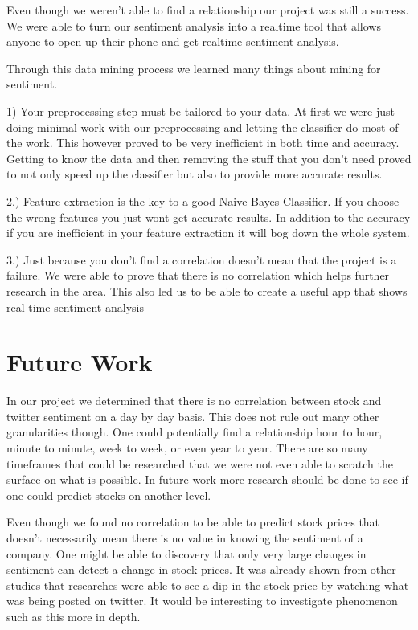 \documentclass{acm_proc_article-sp}
\begin{document}
Even though we weren't able to find a relationship our project was still a success.
We were able to turn our sentiment analysis into a realtime tool that allows anyone
to open up their phone and get realtime sentiment analysis. 

Through this data mining process we learned many things about mining for sentiment.

1) Your preprocessing step must be tailored to your data. At first we were just doing
minimal work with our preprocessing and letting the classifier do most of the work. 
This however proved to be very inefficient in both time and accuracy. Getting to know
the data and then removing the stuff that you don't need proved to not only speed 
up the classifier but also to provide more accurate results.

2.) Feature extraction is the key to a good Naive Bayes Classifier. If you choose
the wrong features you just wont get accurate results. In addition to the accuracy
if you are inefficient in your feature extraction it will bog down the whole system. 

3.) Just because you don't find a correlation doesn't mean that the project is a failure.
We were able to prove that there is no correlation which helps further research in 
the area. This also led us to be able to create a useful app that shows real time 
sentiment analysis

\section{Future Work}

In our project we determined that there is no correlation between stock and
twitter sentiment on a day by day basis. This does not rule out many other
granularities though.  One could potentially find a relationship hour to hour,
minute to minute, week to week, or even year to year. There are so many
timeframes that could be researched that we were not even able to scratch the
surface on what is possible. In future work more research should be done to see
if one could predict stocks on another level. 

Even though we found no correlation to be able to predict stock prices that
doesn't necessarily mean there is no value in knowing the sentiment of a
company. One might be able to discovery that only very large changes in
sentiment can detect a change in stock prices.  It was already shown from other
studies that researches were able to see a dip in the stock price by watching
what was being posted on twitter. It would be interesting to investigate
phenomenon such as this more in depth.  
\end{document}
